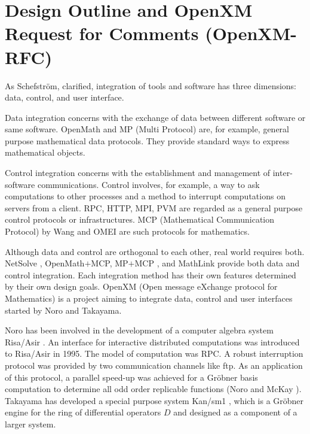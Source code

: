 
\section{Design Outline and OpenXM Request for Comments (OpenXM-RFC)} 

As Schefstr\"om\cite{schefstrom}, clarified,
integration of tools and software has three dimensions:
data, control, and user interface.

Data integration concerns with the exchange of data between different
software or same software.
OpenMath \cite{OpenMath} and MP (Multi Protocol) \cite{GKW} are,
for example, general purpose mathematical data protocols.
They provide standard ways to express mathematical objects.

Control integration concerns with the establishment and management of
inter-software communications.
Control involves, for example, a way to ask computations to other processes
and a method to interrupt computations on servers from a client.
RPC, HTTP, MPI, PVM are regarded as a general purpose control protocols or
infrastructures.
MCP (Mathematical Communication Protocol)
by Wang \cite{iamc} and OMEI \cite{omei} are such protocols for mathematics.

Although data and control are orthogonal to each other,
real world requires both.
NetSolve \cite{netsolve}, OpenMath$+$MCP, MP$+$MCP \cite{iamc},
and MathLink \cite{mathlink} provide both data and control integration.
Each integration method has their own features determined by their
own design goals.
OpenXM (Open message eXchange protocol for Mathematics)
is a project aiming to integrate data, control and user interfaces
started by Noro and Takayama.

Noro has been involved in the development of 
a computer algebra system Risa/Asir \cite{asir}.
An interface for interactive distributed computations was introduced
to Risa/Asir in 1995.
The model of computation was RPC.
A robust interruption protocol was provided 
by  two communication channels like ftp.
As an application of this protocol,
a parallel speed-up was achieved for a Gr\"obner basis computation
to determine all odd order replicable functions 
(Noro and McKay \cite{noro-mckay}).
Takayama has developed
a special purpose system Kan/sm1 \cite{kan},
which is a Gr\"obner engine for the ring of differential operators $D$
and designed as a component of a larger system. 

